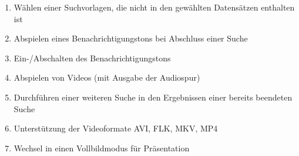 \begin{enumerate} [label=\bfseries /F \arabic*0/]
	\subsection{Wunschanforderungen}
	\item Wählen einer Suchvorlagen, die nicht in den gewählten Datensätzen enthalten ist
	\newline
	\item Abspielen eines Benachrichtigungstons bei Abschluss einer Suche
	\item Ein-/Abschalten des Benachrichtigungstons
	\item Abspielen von Videos (mit Ausgabe der Audiospur)
	\item Durchführen einer weiteren Suche in den Ergebnissen einer bereits beendeten Suche
	\newline
	\item Unterstützung der Videoformate AVI, FLK, MKV, MP4
	\item Wechsel in einen Vollbildmodus für Präsentation
\end{enumerate}

